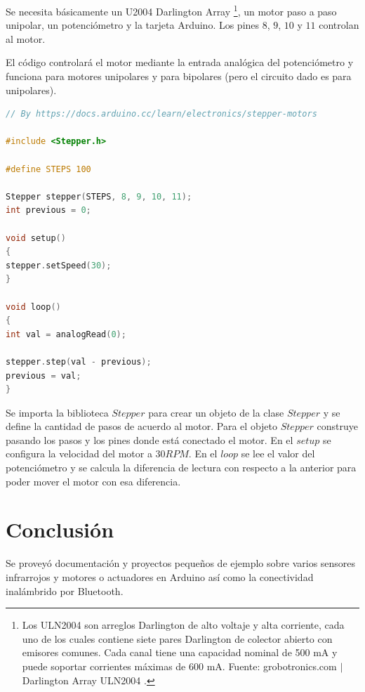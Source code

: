 \documentclass[conference]{IEEEtran}
\begin{document}
Se necesita básicamente un U2004 Darlington Array \footnote{Los ULN2004 son arreglos Darlington de alto voltaje y alta corriente, cada uno de los cuales contiene siete pares Darlington de colector abierto con emisores comunes. Cada canal tiene una capacidad nominal de 500 mA y puede soportar corrientes máximas de 600 mA. Fuente: grobotronics.com $\mid$ Darlington Array ULN2004 \cite{grobotronicscom-2022}.}, un motor paso a paso unipolar, un potenciómetro y la tarjeta Arduino. Los pines $8$, $9$, $10$ y $11$ controlan al motor.

\bigbreak

El código controlará el motor mediante la entrada analógica del potenciómetro y funciona para motores unipolares y para bipolares (pero el circuito dado es para unipolares).

\begin{lstlisting}[language=C, caption=Programa para controlar motor paso a paso unipolar/bipolar mediante potenciómetro. Fuente: Arduino Docs $\mid$ https://docs.arduino.cc/learn/electronics/stepper-motors \cite{arduino-docs-stepper-motor-2022}]
// By https://docs.arduino.cc/learn/electronics/stepper-motors

#include <Stepper.h>

#define STEPS 100

Stepper stepper(STEPS, 8, 9, 10, 11);
int previous = 0;

void setup()
{
stepper.setSpeed(30);
}

void loop()
{
int val = analogRead(0);

stepper.step(val - previous);
previous = val;
}
\end{lstlisting}

\bigbreak

Se importa la biblioteca $Stepper$ para crear un objeto de la clase $Stepper$ y se define la cantidad de pasos de acuerdo al motor. Para el objeto $Stepper$ construye pasando los pasos y los pines donde está conectado el motor. En el $setup$ se configura la velocidad del motor a $30RPM$. En el $loop$ se lee el valor del potenciómetro y se calcula la diferencia de lectura con respecto a la anterior para poder mover el motor con esa diferencia.

\section{Conclusión}

Se proveyó documentación y proyectos pequeños de ejemplo sobre varios sensores infrarrojos y motores o actuadores en Arduino así como la conectividad inalámbrido por Bluetooth.

\printbibliography
\end{document}
